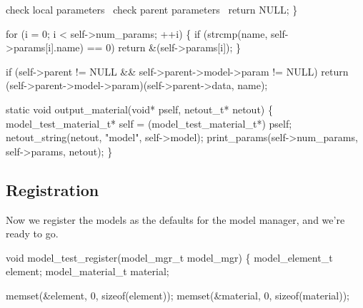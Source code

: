     \LA{}check local parameters~{\nwtagstyle{}}\RA{}
    \LA{}check parent parameters~{\nwtagstyle{}}\RA{}
    return NULL;
\}

\nwendcode{}\nwdocspar

\nwenddocs{}\endmoddef
for (i = 0; i < self->num_params; ++i) \{
    if (strcmp(name, self->params[i].name) == 0)
        return &(self->params[i]);
\}
\nwendcode{}\nwdocspar

\nwenddocs{}\endmoddef
if (self->parent != NULL && self->parent->model->param != NULL)
    return (self->parent->model->param)(self->parent->data, name);
\nwendcode{}\nwdocspar

\nwenddocs{}\plusendmoddef
static void output_material(void* pself, netout_t* netout)
\{
    model_test_material_t* self = (model_test_material_t*) pself;
    netout_string(netout, "model", self->model);
    print_params(self->num_params, self->params, netout);
\}

\nwendcode{}\nwdocspar


\subsection{Registration}

Now we register the models as the defaults for the model manager,
and we're ready to go. %

\nwenddocs{}\endmoddef
void model_test_register(model_mgr_t model_mgr)
\{
    model_element_t  element;
    model_material_t material;

    memset(&element,  0, sizeof(element));
    memset(&material, 0, sizeof(material));

